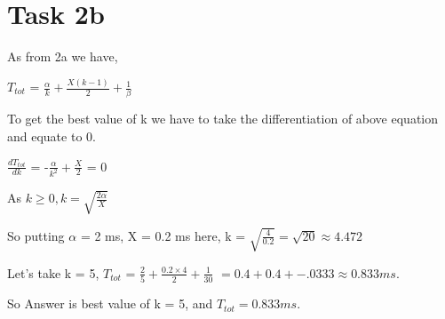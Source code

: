 \section{Task 2b} 

As from 2a we have,

${T_{tot}}$ = $\frac{\alpha}{k} + \frac{X (k-1)}{2} + \frac{1}{\beta}$

To get the best value of k we have to take the differentiation of above equation and equate to 0.

    $\frac{dT_{tot}}{dk}$ = -$\frac{\alpha}{{k}^{2}} +\frac{X}{2}$ = 0

As $k \geq 0,  k = \sqrt{\frac{2\alpha}{X}}$

So putting $\alpha$ = 2 ms, X = 0.2 ms here,  k = $\sqrt{\frac{4}{0.2}} = \sqrt{20} \approx 4.472$

Let's take k = 5, 
${T_{tot}}$ = $\frac{2}{5} + \frac{0.2 \times 4}{2}  + \frac{1}{30}$ \newline
$=0.4 + 0.4 + -.0333 \approx 0.833 ms.$ \newline

So Answer is best value of k = 5, and ${T_{tot}} = 0.833 ms . $

